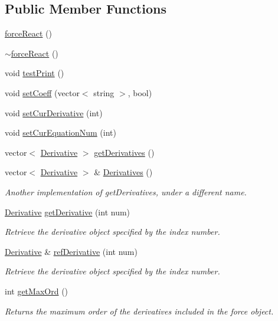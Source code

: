 \subsection*{Public Member Functions}
\begin{DoxyCompactItemize}
\item 
\hyperlink{classforce_react_a5e7cbffe0d5e0fd9a634bc4cc329be4b}{force\-React} ()
\item 
\hyperlink{classforce_react_a38f59a748162de8ab0f97e521bf60698}{$\sim$force\-React} ()
\item 
void \hyperlink{classforce_react_a90d48f4c10e9cc82792f8e873a3132ec}{test\-Print} ()
\item 
void \hyperlink{classforce_react_aeedacc255bc921bf1a6812bb1f998ec5}{set\-Coeff} (vector$<$ string $>$, bool)
\item 
void \hyperlink{classforce_react_a87a77c3c9e73249a6677c721150a354a}{set\-Cur\-Derivative} (int)
\item 
void \hyperlink{classforce_react_ae6344d3b2a7d7ac6a9e3c9d9772fee05}{set\-Cur\-Equation\-Num} (int)
\item 
vector$<$ \hyperlink{class_derivative}{Derivative} $>$ \hyperlink{classforce_react_a8452cb2b5249c46f7612954653b7bc8a}{get\-Derivatives} ()
\item 
vector$<$ \hyperlink{class_derivative}{Derivative} $>$ \& \hyperlink{classforce_react_acb76f120afcc78a6fd56f0bdb440df70}{Derivatives} ()
\begin{DoxyCompactList}\small\item\em Another implementation of get\-Derivatives, under a different name. \end{DoxyCompactList}\item 
\hyperlink{class_derivative}{Derivative} \hyperlink{classforce_react_a2e4e000177394989813940002518bff4}{get\-Derivative} (int num)
\begin{DoxyCompactList}\small\item\em Retrieve the derivative object specified by the index number. \end{DoxyCompactList}\item 
\hyperlink{class_derivative}{Derivative} \& \hyperlink{classforce_react_a7a730eac8ddff77861256f53013ae18f}{ref\-Derivative} (int num)
\begin{DoxyCompactList}\small\item\em Retrieve the derivative object specified by the index number. \end{DoxyCompactList}\item 
int \hyperlink{classforce_react_a1071d201d5dd52cbfc757ab43cb1db79}{get\-Max\-Ord} ()
\begin{DoxyCompactList}\small\item\em Returns the maximum order of the derivatives included in the force object. \end{DoxyCompactList}\end{DoxyCompactItemize}
